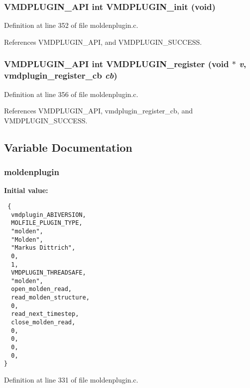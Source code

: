 \subsubsection{\setlength{\rightskip}{0pt plus 5cm}VMDPLUGIN\_\-API int VMDPLUGIN\_\-init (void)}\label{moldenplugin_8c_a6}




Definition at line 352 of file moldenplugin.c.

References VMDPLUGIN\_\-API, and VMDPLUGIN\_\-SUCCESS.
\subsubsection{\setlength{\rightskip}{0pt plus 5cm}VMDPLUGIN\_\-API int VMDPLUGIN\_\-register (void $\ast$ {\em v}, {\bf vmdplugin\_\-register\_\-cb} {\em cb})}\label{moldenplugin_8c_a7}




Definition at line 356 of file moldenplugin.c.

References VMDPLUGIN\_\-API, vmdplugin\_\-register\_\-cb, and VMDPLUGIN\_\-SUCCESS.

\subsection{Variable Documentation}
\subsubsection{ moldenplugin\hspace{0.3cm}{\tt  [static]}}\label{moldenplugin_8c_a0}


{\bf Initial value:}

\footnotesize\begin{verbatim} {
  vmdplugin_ABIVERSION,
  MOLFILE_PLUGIN_TYPE,                         
  "molden",                                    
  "Molden",                                    
  "Markus Dittrich",                           
  0,                                           
  1,                                           
  VMDPLUGIN_THREADSAFE,                        
  "molden",
  open_molden_read,
  read_molden_structure,
  0,
  read_next_timestep, 
  close_molden_read,
  0,
  0,
  0, 
  0,
}\end{verbatim}\normalsize 


Definition at line 331 of file moldenplugin.c.